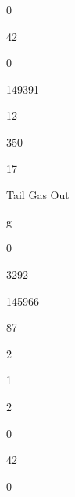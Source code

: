 \documentclass[a4paper,portrait,12pt]{article}
\begin{document}
0





42





0





149391





12





350





17





\begin{flushleft}
Tail Gas Out
\end{flushleft}





\begin{flushleft}
g
\end{flushleft}





0





3292





145966





87





2





1





2





0





42





0
\end{document}
